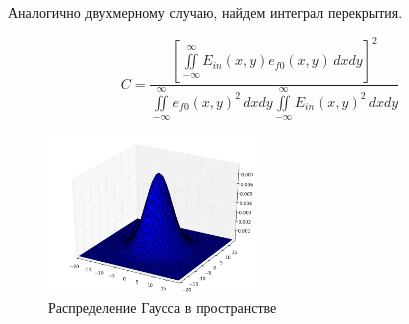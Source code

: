 Аналогично двухмерному случаю, найдем интеграл перекрытия.

\begin{equation}
	\label{coupling}
	C = \frac{\left[\iint\limits_{-\infty}^{\infty}E_{in}(x,y)e_{f0}(x,y) \,dxdy\right]^2}
	{\iint\limits_{-\infty}^{\infty}e_{f0}(x,y)^2 \,dxdy
	 \iint\limits_{-\infty}^{\infty}E_{in}(x,y)^2 \,dxdy}
\end{equation}

\begin{figure}[h!]
	\includegraphics[width=0.5\textwidth]{img/gauss3d.png}
	\caption{Распределение Гаусса в пространстве}
	\label{gauss3dPlot}
\end{figure}


